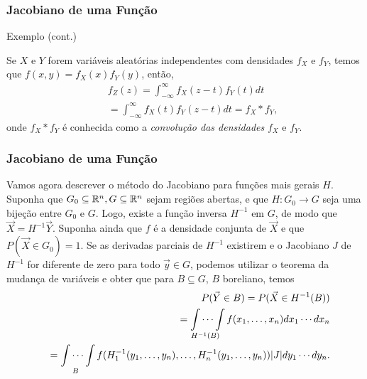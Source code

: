 \begin{frame}
\frametitle{\textbf{Jacobiano de uma Função}}
\baselineskip=13pt
\begin{block}{Exemplo (cont.)}


Se $X$ e $Y$ forem variáveis aleatórias independentes com densidades $f_X$ e $f_Y$, temos que $f(x,y)=f_X(x)f_Y(y)$, então,
\begin{eqnarray}
& & f_Z(z)=\int_{-\infty}^{\infty}f_X(z-t)f_Y(t)dt \nonumber \\
& &=\int_{-\infty}^{\infty}f_X(t)f_Y(z-t)dt  =f_X*f_Y,\nonumber
\end{eqnarray}
onde $f_X*f_Y$ é conhecida como a {\em convolução das densidades} $f_X$ e $f_Y$.


\end{block}
\end{frame}

\begin{frame}
\frametitle{\textbf{Jacobiano de uma Função}}
\baselineskip=13pt
\begin{block}{}


Vamos agora descrever o método do Jacobiano para funções mais gerais $H$. Suponha que $G_0\subseteq \mathbb{R}^n,G\subseteq \mathbb{R}^n$ sejam regiões abertas, e que $H:G_0\rightarrow G$ seja uma bijeção entre $G_0$ e $G$. Logo, existe a função inversa $H^{-1}$ em $G$, de modo que $\vec{X}=H^{-1}\vec{Y}$. Suponha ainda que $f$ é a densidade conjunta de $\vec{X}$ e que $P(\vec{X}\in G_0)=1$. Se as derivadas parciais de $H^{-1}$ existirem e o Jacobiano $J$ de $H^{-1}$ for diferente de zero para todo $\vec{y}\in G$, podemos utilizar o teorema da mudança de variáveis e obter que para $B\subseteq G$, $B$ boreliano, temos
\begin{eqnarray}
& & P(\vec{Y}\in B)=P(\vec{X}\in H^{-1}(B))\nonumber\\
& & =\idotsint\limits_{H^{-1}(B)} f(x_1,\ldots,x_n)dx_1\cdots dx_n \nonumber\\
& & =\idotsint\limits_{B} f(H_1^{-1}(y_1,\ldots,y_n),\ldots,H_n^{-1}(y_1,\ldots,y_n))|J|dy_1\cdots dy_n.\nonumber
\end{eqnarray}

\end{block}
\end{frame}

